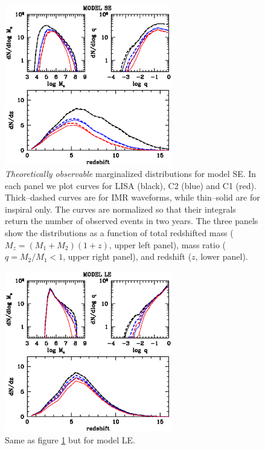 \documentclass{iopart}
\begin{document}
\begin{figure}[H]
\center
   \includegraphics[width=0.65\textwidth]{FigSMBHModSel/FIG_MODEL_SE_DIST.eps}
\caption{{\it Theoretically observable} marginalized distributions for model SE. In each panel we plot curves for LISA (black), C2 (blue) and C1 (red). Thick--dashed curves are for IMR waveforms, while thin--solid are for inspiral only. The curves are normalized so that their integrals return the number of observed events in two years. The three panels show the distributions as a function of total redshifted mass ($M_z=(M_1+M_2)(1+z)$, upper left panel), mass ratio ($q=M_2/M_1<1$, upper right panel), and redshift ($z$, lower panel).
\label{F:MBHbModel:fig1} } 
\end{figure}

\begin{figure}[H]
\center
   \includegraphics[width=0.65\textwidth]{FigSMBHModSel/FIG_MODEL_LE_DIST.eps}
\caption{Same as figure \ref{F:MBHbModel:fig1} but for model LE.
\label{F:MBHbModel:fig2} } 
\end{figure}
\end{document}
